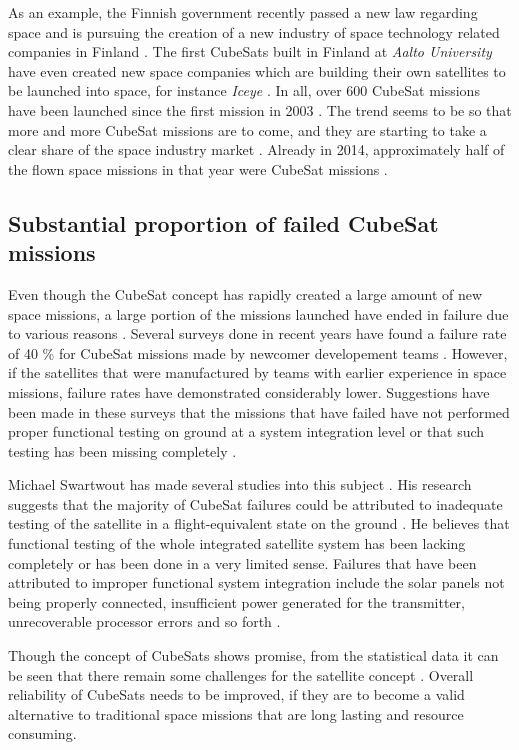 \documentclass[english,12pt,a4paper,pdftex,elec,utf8]{aaltothesis}
\begin{document}
As an example, the Finnish government recently passed a new law regarding space and is pursuing the creation of a new industry of space technology related companies in Finland \cite{filaw}. The first CubeSats built in Finland at \textit{Aalto University} have even created new space companies which are building their own satellites to be launched into space, for instance \textit{Iceye} \cite{iceye}. In all, over 600 CubeSat missions have been launched since the first mission in 2003 \cite{Swart2017kalvo}. The trend seems to be so that more and more CubeSat missions are to come, and they are starting to take a clear share of the space industry market \cite{SpaceWorks2017}. Already in 2014, approximately half of the flown space missions in that year were CubeSat missions \cite{Swart2016}.\par 
\subsection{Substantial proportion of failed CubeSat missions}
Even though the CubeSat concept has rapidly created a large amount of new space missions, a large portion of the missions launched have ended in failure due to various reasons \cite{Swart2016, Langer}. Several surveys done in recent years have found a failure rate of 40 \% for CubeSat missions made by newcomer developement teams \cite{Swart2016, Langer, Swart1, Swart2015}. However, if the satellites that were manufactured by teams with earlier experience in space missions, failure rates have demonstrated considerably lower. Suggestions have been made in these surveys that the missions that have failed have not performed proper functional testing on ground at a system integration level or that such testing has been missing completely \cite{Swart2016, Langer, Swart1}.\par
Michael Swartwout has made several studies into this subject \cite{Swart2017kalvo}. His research suggests that the majority of CubeSat failures could be attributed to inadequate testing of the satellite in a flight-equivalent state on the ground \cite{Swart2016, Swart1, Swart2015}. He believes that functional testing of the whole integrated satellite system has been lacking completely or has been done in a very limited sense. Failures that have been attributed to improper functional system integration include the solar panels not being properly connected, insufficient power generated for the transmitter, unrecoverable processor errors and so forth \cite{Swart1}. \par
Though the concept of CubeSats shows promise, from the statistical data it can be seen that there remain some challenges for the satellite concept \cite{Swart2017kalvo, Swart2016, Langer, Swart1, Swart2015}. Overall reliability of CubeSats needs to be improved, if they are to become a valid alternative to traditional space missions that are long lasting and resource consuming.\par 
\end{document}
